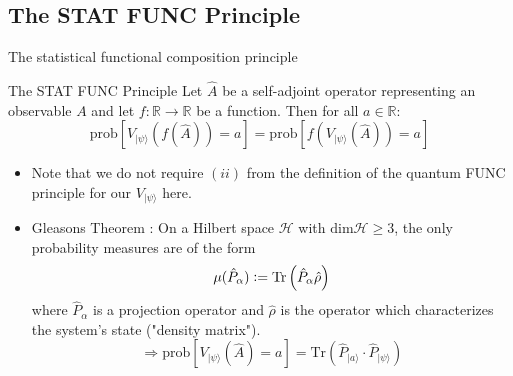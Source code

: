 \documentclass{beamer}
\newcommand{\defeq}{\vcentcolon=}
\newcommand{\R}{\mathbb{R}}
\begin{document}
\subsection{The STAT FUNC Principle}

\begin{frame}{The statistical functional composition principle}
\begin{block}{The STAT FUNC Principle}
Let $\hat A$ be a self-adjoint operator representing an observable $A$ and let $f:\R\rightarrow\R$ be a function. Then for all $a\in\R$:
$$
\mathrm{prob}\left[V_{|\psi\rangle}(f(\hat A))=a\right]=\mathrm{prob}\left[f(V_{|\psi\rangle}(\hat A))=a\right]
$$
\end{block}
\vfill
\begin{itemize}
\item Note that we do not require $(ii)$ from the definition of the quantum FUNC principle for our $V_{|\psi\rangle}$ here. %
\item Gleasons Theorem \cite{10.2307/24900629}: On a Hilbert space $\mathcal H$ with $\mathrm{dim}\mathcal H\geq 3$, the only probability measures are of the form
$$
\mu(\hat P_\alpha)\defeq\mathrm{Tr}\left(\hat P_\alpha\hat\rho\right)
$$
where $\hat P_\alpha$ is a projection operator and $\hat\rho$ is the operator which characterizes the system's state ("density matrix").\\
$$\Rightarrow\mathrm{prob}\left[V_{|\psi\rangle}(\hat A)=a\right]=\mathrm{Tr}(\hat P_{|a\rangle}\cdot\hat P_{|\psi\rangle})$$
\end{itemize}
\end{frame}
\end{document}
